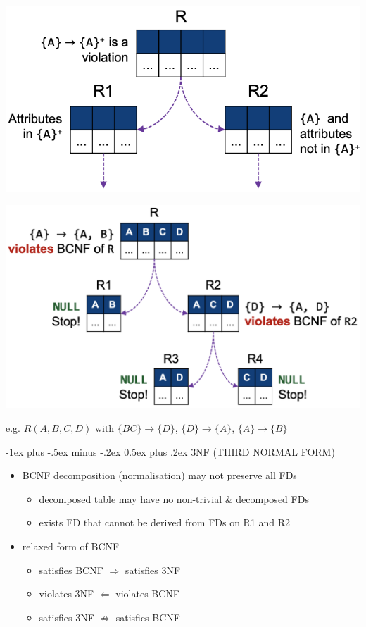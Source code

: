 \documentclass[10pt, landscape]{article}
\makeatletter
\renewcommand{\section}{\@startsection{section}{1}{0mm}%
  {-1ex plus -.5ex minus -.2ex}%
  {0.5ex plus .2ex}%
{\normalfont\large\bfseries}}
\makeatother
\begin{document}
\begin{multicols}{3}
  \begin{tightcenter}
    \begin{minipage}[c]{0.47\linewidth}
      \includegraphics[width=0.95\linewidth]{cs2102-bcnf-decomposition.png} 
    \end{minipage}
    \begin{minipage}[c]{0.47\linewidth}
      \includegraphics[width=0.95\linewidth]{cs2102-bcnf-decomposition-example.png} 
    \end{minipage}
    e.g. $R(A,B,C,D)$ with $\{BC\} \rightarrow \{D\}$, $\{D\} \rightarrow \{A\}$,  $\{A\} \rightarrow \{B\}$
  \end{tightcenter}

  \section{3NF (THIRD NORMAL FORM)}
  \begin{itemize}
    \item BCNF decomposition (normalisation) may not preserve all FDs
      \begin{itemize}
        \item decomposed table may have no non-trivial \& decomposed FDs
        \item exists FD that cannot be derived from FDs on R1 and R2
      \end{itemize}
    \item relaxed form of BCNF
      \begin{itemize}
        \item satisfies BCNF $\Rightarrow$ satisfies 3NF
        \item violates 3NF $\Leftarrow$ violates BCNF
        \item satisfies 3NF $\not\Rightarrow$ satisfies BCNF
      \end{itemize}
  \end{itemize}


\end{multicols}
\end{document}
